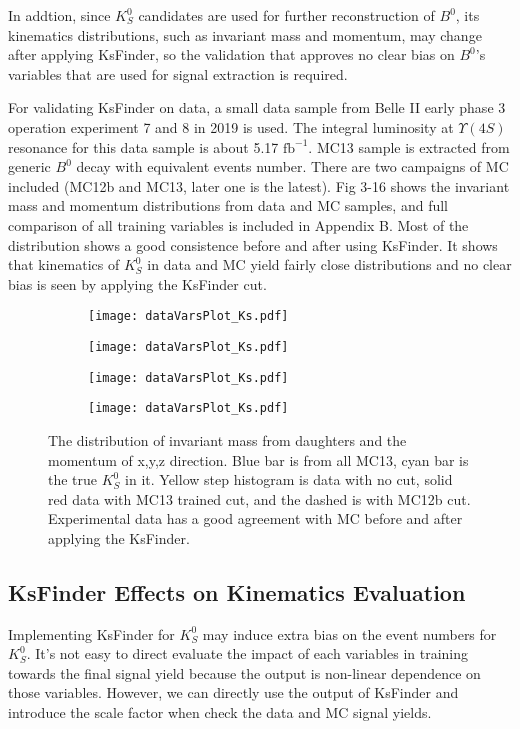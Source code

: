 In addtion, since $K_S^0$ candidates are used for further reconstruction of $B^0$, its kinematics distributions, such as invariant mass and momentum, may change after applying KsFinder, so the validation that approves no clear bias on $B^0$'s variables that are used for signal extraction is required.

For validating KsFinder on data, a small data sample from Belle II early phase 3 operation experiment 7 and 8 in 2019 is used. The integral luminosity at $\Upsilon(4S)$ resonance for this data sample is about 5.17 $\text{fb}^{-1}$.  MC13 sample is extracted from generic $B^0$ decay with equivalent events number. There are two campaigns of MC included (MC12b and MC13, later one is the latest). Fig 3-16 shows the invariant mass and momentum distributions from data and MC samples, and full comparison of all training variables is included in Appendix B. Most of the distribution shows a good consistence before and after using KsFinder. It shows that kinematics of $K_S^0$ in data and MC yield fairly close distributions and no clear bias is seen by applying the KsFinder cut.

\begin{figure}[H]
	\begin{subfigure}{0.5\linewidth}
		\texttt{[image: dataVarsPlot\_Ks.pdf]}
	\end{subfigure}
	\begin{subfigure}{0.5\linewidth}
		\texttt{[image: dataVarsPlot\_Ks.pdf]}
	\end{subfigure}
	\bigskip
	\begin{subfigure}{0.5\linewidth}
		\texttt{[image: dataVarsPlot\_Ks.pdf]}
	\end{subfigure}
	\begin{subfigure}{0.5\linewidth}
		\texttt{[image: dataVarsPlot\_Ks.pdf]}
	\end{subfigure}
\caption{The distribution of invariant mass from daughters and the momentum of x,y,z direction. Blue bar is from all MC13, cyan bar is the true $K_S^0$ in it. Yellow step histogram is data with no cut, solid red data with MC13 trained cut, and the dashed is with MC12b cut. Experimental data has a good agreement with MC before and after applying the KsFinder.}
\end{figure}

\subsection{KsFinder Effects on Kinematics Evaluation}
Implementing KsFinder for $K_S^0$ may induce extra bias on the event numbers for $K_S^0$. It's not easy to direct evaluate the impact of each variables in training towards the final signal yield because the output is non-linear dependence on those variables. However, we can directly use the output of KsFinder and introduce the scale factor when check the data and MC signal yields. 
 
